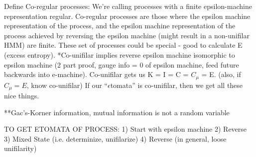 \documentclass[prl,twocolumn,superscriptaddress,preprintnumbers,floatfix]{revtex4-1}
\begin{document}
Define Co-regular processes: We're calling processes with a finite epsilon-machine representation regular. Co-regular processes are those where the epsilon machine representation of the process, and the epsilon machine representation of the process achieved by reversing the epsilon machine (might result in a non-unifilar HMM) are finite.  These set of processes could be special - good to calculate E (excess entropy).  *Co-unifilar implies reverse epsilon machine isomorphic to epsilon machine (2 part proof, gauge info = 0 of epsilon machine, feed future backwards into e-machine). Co-unifilar gets us K = I = C = $C_{\mu}$ = E.  (also, if $C_{\mu} = E$, know co-unifilar) If our ``$\epsilon$tomata'' is co-unifilar, then we get all these nice things.  

**Gac's-Korner information, mutual information is not a random variable 

TO GET ETOMATA OF PROCESS:
1) Start with epsilon machine
2) Reverse 
3) Mixed State (i.e. determinize, unifilarize)
4) Reverse (in general, loose unifilarity)




\end{document}
